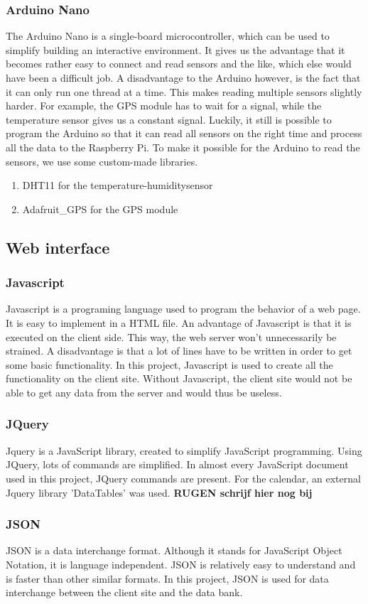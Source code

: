\subsubsection{Arduino Nano}
The Arduino Nano is a single-board microcontroller, which can be used to simplify building an interactive environment. It gives us the advantage that it becomes rather easy to connect and read sensors and the like, which else would have been a difficult job. A disadvantage to the Arduino however, is the fact that it can only run one thread at a time. This makes reading multiple sensors slightly harder. For example, the GPS module has to wait for a signal, while the temperature sensor gives us a constant signal. Luckily, it still is possible to program the Arduino so that it can read all sensors on the right time and process all the data to the Raspberry Pi.
To make it possible for the Arduino to read the sensors, we use some custom-made libraries.
\begin{enumerate}
 \item DHT11 for the temperature-humiditysensor
 \item Adafruit_GPS for the GPS module
\end{enumerate}

\subsection{Web interface}
\subsubsection{Javascript}
Javascript is a programing language used to program the behavior of a web page. It is easy to implement in a HTML file. An advantage of Javascript is that it is executed on the client side. This way, the web server won't unnecessarily be strained. A disadvantage is that a lot of lines have to be written in order to get some basic functionality. 
In this project, Javascript is used to create all the functionality on the client site. Without Javascript, the client site would not be able to get any data from the server and would thus be useless. 

\subsubsection{JQuery}
Jquery is a JavaScript library, created to simplify JavaScript programming. Using JQuery, lots of commands are simplified. In almost every JavaScript document used in this project, JQuery commands are present. 
For the calendar, an external Jquery library 'DataTables' was used. 
\textbf{RUGEN schrijf hier nog bij}

\subsubsection{JSON}
JSON is a data interchange format. Although it stands for JavaScript Object Notation, it is language independent. JSON is relatively easy to understand and is faster than other similar formats. In this project, JSON is used for data interchange between the client site and the data bank. 
